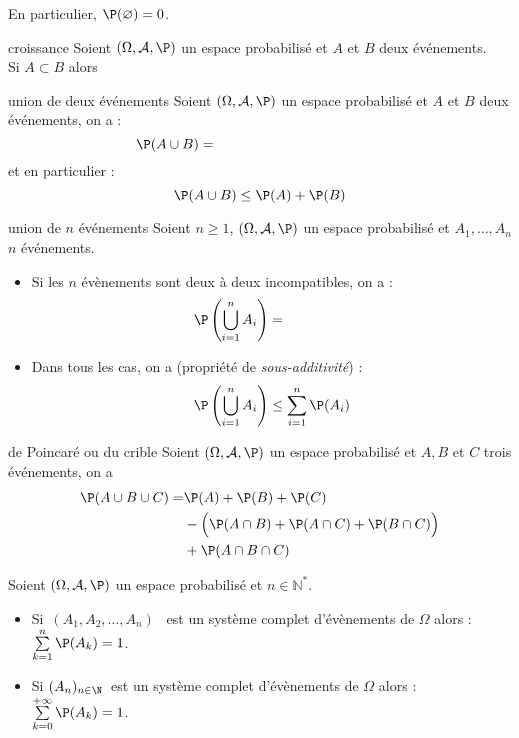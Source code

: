 \documentclass[a4paper,10pt]{report}
\begin{document}
\begin{itemize}
\begin{Remarque}{}
 En particulier, $\P(\varnothing)= 0$.
\end{Remarque}

\begin{Proposition}{croissance}
Soient $(\Omega, \mathcal{A}, \P)$ un espace probabilisé et $A$ et $B$ deux événements.\\
Si $A \subset B$ alors $\phantom{\P(A) \leq \P(B)}$
\end{Proposition}

\begin{Theoreme}{union de deux événements}
Soient $(\Omega, \mathcal{A}, \P)$ un espace probabilisé et $A$ et $B$ deux événements, on a :
$$\P(A \cup B)=\phantom{\P(A)+\P(B)-P(A \cap B)}$$
et en particulier :
$$ \P(A \cup B) \leq \P(A) + \P(B)$$
\end{Theoreme}

\begin{Theoreme}{union de $n$ événements}
Soient $n \geq 1$, $(\Omega, \mathcal{A}, \P)$ un espace probabilisé et $A_1, \ldots, A_n$ $n$ événements.
\begin{itemize}
\item Si les $n$ évènements sont deux à deux incompatibles, on a :
$$\P \left( \bigcup_{i=1}^n A_i\right)= \phantom{\sum_{i=1}^n \P(A_i)}$$
\item Dans tous les cas, on a (propriété de \emph{sous-additivité}) :
$$ \P \left(\bigcup_{i=1}^n A_i \right) \leq \sum_{i=1}^n \P(A_i) $$
\end{itemize}
\end{Theoreme}

\begin{Theoreme}{\label{Prop2}de Poincaré ou du crible}
Soient $(\Omega, \mathcal{A}, \P)$ un espace probabilisé et $A, B$ et $C$ trois événements, on a
 \begin{align*}
  \P(A\cup B \cup C) = & \P(A) + \P(B) + \P(C) \\
  &- \Big( \P(A\cap B) + \P(A\cap C) + \P(B\cap C) \Big) \\
  &+ \P(A\cap B \cap C)
 \end{align*}
\end{Theoreme}


\begin{Proposition}{}
Soient $(\Omega, \mathcal{A}, \P)$ un espace probabilisé et $n \in \mathbb{N}^*$.
\begin{itemize}
\item Si $\,(A_1, A_2,\ldots, A_n)$ \ est un système complet d'évènements de $\Omega$ alors :
$\sum\limits_{k=1}^{n } \P(A_k) = 1$. 
\item Si $(A_n)_{n\in \N}\,$ est un système complet d'évènements de $\Omega$ alors :
$\sum\limits_{k=0}^{+\infty } \P(A_k) = 1$. 
\end{itemize}
\end{Proposition}


\end{itemize}
\end{document}
